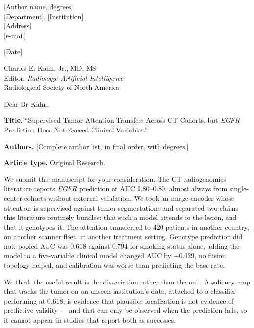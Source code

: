 \documentclass[11pt]{article}
\begin{document}
[Author name, degrees] \\
{}[Department], [Institution] \\
{}[Address] \\
{}[e-mail] \quad [telephone]

\vspace{1.2em}
[Date]

\vspace{1.2em}
Charles E. Kahn, Jr., MD, MS \\
Editor, \textit{Radiology: Artificial Intelligence} \\
Radiological Society of North America

\vspace{1.2em}
Dear Dr Kahn,

\textbf{Title.} ``Supervised Tumor Attention Transfers Across CT Cohorts, but
\textit{EGFR} Prediction Does Not Exceed Clinical Variables.''

\textbf{Authors.} [Complete author list, in final order, with degrees.]

\textbf{Article type.} Original Research.

\medskip
We submit this manuscript for your consideration. The CT radiogenomics
literature reports \textit{EGFR} prediction at AUC 0.80--0.89, almost always from
single-center cohorts without external validation. We took an image encoder whose
attention is supervised against tumor segmentations and separated two claims this
literature routinely bundles: that such a model attends to the lesion, and that it
genotypes it. The attention transferred to 420 patients in another country, on
another scanner fleet, in another treatment setting. Genotype prediction did not: pooled AUC was 0.618 against 0.794 for smoking status
alone, adding the model to a five-variable clinical model changed AUC by
$-0.029$, no fusion topology helped, and calibration was worse than predicting the
base rate.

We think the useful result is the dissociation rather than the null. A saliency
map that tracks the tumor on an unseen institution's data, attached to a
classifier performing at 0.618, is evidence that plausible localization is not
evidence of predictive validity --- and that can only be observed when the
prediction fails, so it cannot appear in studies that report both as successes.
\end{document}
